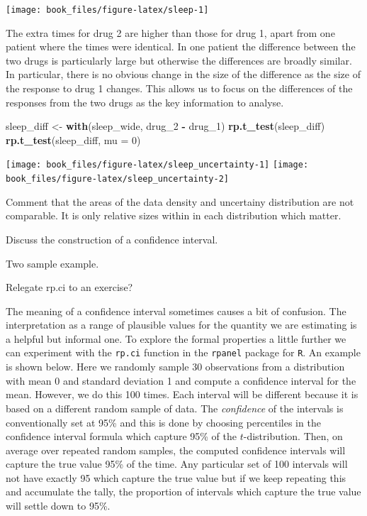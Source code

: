 \documentclass[
]{book}
\newenvironment{Shaded}{\begin{snugshade}}{\end{snugshade}}
\newcommand{\AttributeTok}[1]{\textcolor[rgb]{0.13,0.29,0.53}{#1}}
\newcommand{\DecValTok}[1]{\textcolor[rgb]{0.00,0.00,0.81}{#1}}
\newcommand{\FunctionTok}[1]{\textcolor[rgb]{0.13,0.29,0.53}{\textbf{#1}}}
\newcommand{\NormalTok}[1]{#1}
\newcommand{\OtherTok}[1]{\textcolor[rgb]{0.56,0.35,0.01}{#1}}
\newcommand{\SpecialCharTok}[1]{\textcolor[rgb]{0.81,0.36,0.00}{\textbf{#1}}}
\begin{document}
\begin{center}\texttt{[image: book\_files/figure-latex/sleep-1]} \end{center}

The extra times for drug 2 are higher than those for drug 1, apart from one patient where the times were identical. In one patient the difference between the two drugs is particularly large but otherwise the differences are broadly similar. In particular, there is no obvious change in the size of the difference as the size of the response to drug 1 changes. This allows us to focus on the differences of the responses from the two drugs as the key information to analyse.

\begin{Shaded}
\begin{Highlighting}[]
\NormalTok{sleep\_diff }\OtherTok{\textless{}{-}} \FunctionTok{with}\NormalTok{(sleep\_wide, drug\_2 }\SpecialCharTok{{-}}\NormalTok{ drug\_1)}
\FunctionTok{rp.t\_test}\NormalTok{(sleep\_diff)}
\FunctionTok{rp.t\_test}\NormalTok{(sleep\_diff, }\AttributeTok{mu =} \DecValTok{0}\NormalTok{)}
\end{Highlighting}
\end{Shaded}

\texttt{[image: book\_files/figure-latex/sleep\_uncertainty-1]} \texttt{[image: book\_files/figure-latex/sleep\_uncertainty-2]}

Comment that the areas of the data density and uncertainy distribution are not comparable. It is only relative sizes within in each distribution which matter.

Discuss the construction of a confidence interval.

Two sample example.

Relegate rp.ci to an exercise?

The meaning of a confidence interval sometimes causes a bit of confusion. The interpretation as a range of plausible values for the quantity we are estimating is a helpful but informal one. To explore the formal properties a little further we can experiment with the \texttt{rp.ci} function in the \texttt{rpanel} package for \texttt{R}. An example is shown below. Here we randomly sample 30 observations from a distribution with mean 0 and standard deviation 1 and compute a confidence interval for the mean. However, we do this 100 times. Each interval will be different because it is based on a different random sample of data. The \emph{confidence} of the intervals is conventionally set at 95\% and this is done by choosing percentiles in the confidence interval formula which capture 95\% of the \(t\)-distribution. Then, on average over repeated random samples, the computed confidence intervals will capture the true value 95\% of the time. Any particular set of 100 intervals will not have exactly 95 which capture the true value but if we keep repeating this and accumulate the tally, the proportion of intervals which capture the true value will settle down to 95\%.
\end{document}
